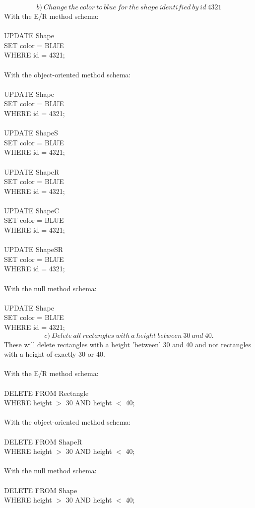 \documentclass[12pt]{article}
\begin{document}
$$b)\: Change\:the\:color\:to\:blue\:for\:the\:shape\:identified\:by\:id\:4321$$
With the E/R method schema:\\
\\
UPDATE Shape\\
SET color = BLUE\\
WHERE id = 4321;\\
\\
With the object-oriented method schema:\\
\\
UPDATE Shape\\
SET color = BLUE\\
WHERE id = 4321;\\
\\
UPDATE ShapeS\\
SET color = BLUE\\
WHERE id = 4321;\\
\\
UPDATE ShapeR\\
SET color = BLUE\\
WHERE id = 4321;\\
\\
UPDATE ShapeC\\
SET color = BLUE\\
WHERE id = 4321;\\
\\
UPDATE ShapeSR\\
SET color = BLUE\\
WHERE id = 4321;\\
\\
With the null method schema:\\
\\
UPDATE Shape\\
SET color = BLUE\\
WHERE id = 4321;\\

$$c)\: Delete\:all\:rectangles\:with\:a\:height\:between\:30\:and\:40.$$
These will delete rectangles with a height 'between' 30 and 40 and not rectangles with a height of exactly 30 or 40.\\
\\
With the E/R method schema:\\
\\
DELETE FROM Rectangle\\
WHERE height $>$ 30 AND height $<$ 40;\\
\\
With the object-oriented method schema:\\
\\
DELETE FROM ShapeR\\
WHERE height $>$ 30 AND height $<$ 40;\\
\\
With the null method schema:\\
\\
DELETE FROM Shape\\
WHERE height $>$ 30 AND height $<$ 40;
\end{document}
